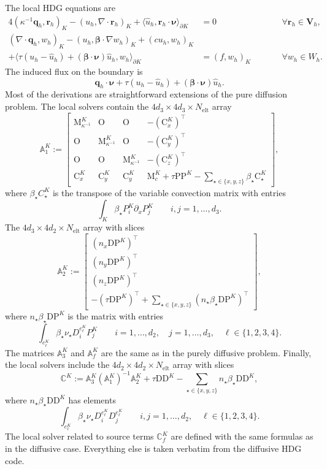 \documentclass[10pt,english]{article}
\newcommand{\Nelt}{{N_{\mathrm{elt}}}}
\begin{document}
The local HDG equations are 
\begin{alignat*}{4}
(\kappa^{-1}\boldsymbol q_h,\boldsymbol r_h)_K-(u_h,\nabla\cdot\boldsymbol r_h)_K+\langle \widehat u_h,\boldsymbol r_h\cdot\boldsymbol\nu\rangle_{\partial K} &=0 &\qquad & \forall \boldsymbol r_h \in \boldsymbol V_h,\\
(\nabla\cdot\boldsymbol q_h,w_h)_K-(u_h,\boldsymbol\beta\cdot\nabla w_h)_K + (c u_h,w_h)_K\\
+\langle \tau (u_h-\widehat u_h)+(\boldsymbol\beta\cdot\boldsymbol\nu) \widehat u_h,w_h\rangle_{\partial K} &=(f,w_h)_K & &\forall w_h \in W_h.
\end{alignat*}
The induced flux on the boundary is
\[
\boldsymbol q_h\cdot\boldsymbol\nu +\tau (u_h-\widehat u_h)+(\boldsymbol\beta\cdot\boldsymbol\nu) \widehat u_h.
\]
Most of the derivations are straightforward extensions of the pure diffusion problem. The local solvers contain the $4d_3\times 4d_3\times \Nelt$ array
\[
\mathbb A_1^K:=\left[\begin{array}{cccl} \mathrm M_{\kappa^{-1}}^K & \mathrm O &\mathrm O & -(\mathrm C_x^K)^\top \\ 
 \mathrm O & \mathrm M_{\kappa^{-1}}^K & \mathrm O & -(\mathrm C_y^K)^\top\\
\mathrm O & \mathrm O & \mathrm M_{\kappa^{-1}}^K & -(\mathrm C_z^K)^\top\\
\mathrm C_x^K & \mathrm C_y^K & \mathrm C_y^K & \mathrm M_c^K+\tau\mathrm{PP}^K-\sum_{\star\in \{x,y,z\}} \beta_\star \mathrm C_\star^K
\end{array}\right],
\]
where $\beta_\star C_\star^K$ is the transpose of the variable convection matrix with entries
\[
\int_K \beta_\star P_i^K \partial_x P_j^K \qquad i,j=1,\ldots,d_3.
\]
The $4d_3\times 4d_2\times \Nelt$ array with slices
\[
 \mathbb A_2^K:=\left[\begin{array}{l} (n_x\mathrm{DP}^K)^\top\\ (n_y\mathrm{DP}^K)^\top \\
(n_z\mathrm{DP}^K)^\top \\
-(\tau\mathrm{DP}^K)^\top+\sum_{\star\in \{x,y,z\}} (n_\star\beta_\star \mathrm D \mathrm P^K)^\top\end{array}\right],
\]
where $n_\star\beta_\star \mathrm D\mathrm P^K$ is the matrix with entries
\[
\int_{e_\ell^K}\beta_\star\nu_\star D_i^{e_\ell^K} P_j^K \qquad i=1,\ldots,d_2, \quad j=1,\ldots,d_3,\quad \ell\in \{1,2,3,4\}.
\]
The matrices $\mathbb A_3^K$ and $\mathbb A_f^K$ are the same as in the purely diffusive problem. Finally, the local solvers include the $4d_2\times 4d_2\times \Nelt$ array with slices
\[
\mathbb C^K:=\mathbb A_3^K(\mathbb A_1^K)^{-1} \mathbb A_2^K +\tau\mathrm D\mathrm D^K-\sum_{\star\in \{x,y,z\}} n_\star\beta_\star\mathrm D\mathrm D^K,
\]
where $n_\star\beta_\star\mathrm D\mathrm D^K$ has elements
\[
\int_{e_\ell^K}\beta_\star\nu_\star D_i^{e_\ell^K} D_j^{e_\ell^K} \qquad i,j=1,\ldots,d_2, \quad \ell\in \{1,2,3,4\}.
\]
The local solver related to source terms $\mathbb C_f^K$ are defined with the same formulas as in the diffusive case. Everything else is taken verbatim from the diffusive HDG code.
\end{document}

